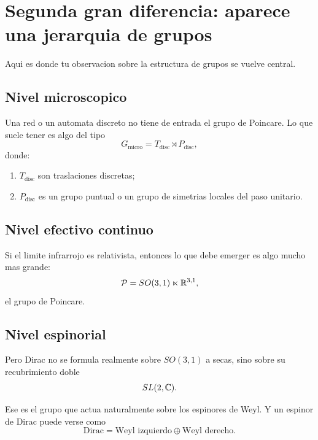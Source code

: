 \section{Segunda gran diferencia: aparece una jerarquia de grupos}

Aqui es donde tu observacion sobre la estructura de grupos se vuelve central.

\subsection{Nivel microscopico}

Una red o un automata discreto no tiene de entrada el grupo de Poincare. Lo que suele tener es algo del tipo
\begin{equation}
G_{\mathrm{micro}} = T_{\mathrm{disc}} \rtimes P_{\mathrm{disc}},
\end{equation}
donde:

\begin{enumerate}[leftmargin=*]
  \item \(T_{\mathrm{disc}}\) son traslaciones discretas;
  \item \(P_{\mathrm{disc}}\) es un grupo puntual o un grupo de simetrias locales del paso unitario.
\end{enumerate}

\subsection{Nivel efectivo continuo}

Si el limite infrarrojo es relativista, entonces lo que debe emerger es algo mucho mas grande:
\begin{equation}
\mathcal P = SO(3,1)\ltimes \mathbb{R}^{3,1},
\label{c17:eq:poincare}
\end{equation}
el grupo de Poincare.

\subsection{Nivel espinorial}

Pero Dirac no se formula realmente sobre \(SO(3,1)\) a secas, sino sobre su recubrimiento doble
\begin{equation}
SL(2,\mathbb{C}).
\label{c17:eq:sl2c}
\end{equation}

Ese es el grupo que actua naturalmente sobre los espinores de Weyl. Y un espinor de Dirac puede verse como
\begin{equation}
\text{Dirac} = \text{Weyl izquierdo} \oplus \text{Weyl derecho}.
\end{equation}

